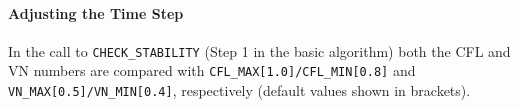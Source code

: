 \documentclass[11pt]{article}
\begin{document}
\paragraph{Adjusting the Time Step} In the call to {\tt CHECK\_STABILITY} (Step 1 in the basic algorithm) both the CFL and VN numbers are compared with {\tt CFL\_MAX[1.0]/CFL\_MIN[0.8]} and {\tt VN\_MAX[0.5]/VN\_MIN[0.4]}, respectively (default values shown in brackets).



%
%
%
%
%
%
\end{document}
